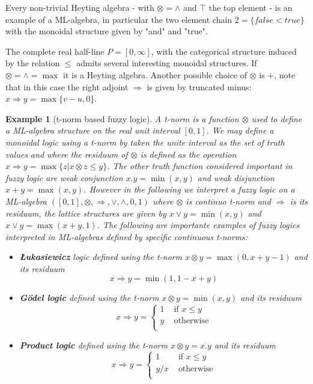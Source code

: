 \documentclass[oribibl]{llncs}
\newtheorem{exam}{Example}
\begin{document}
Every non-trivial Heyting algebra - with $\otimes=\wedge$ and $\top$ the top element - is an example of a ML-algebra, in particular the two element chain $2=\{false<true\}$ with the monoidal structure given by "and" and "true".

The complete real half-line $P=[0,\infty]$, with the categorical structure induced by the relation $\leq$ admits several interesting monoidal structures. If $\otimes=\wedge=\max$ it is a Heyting algebra. Another possible choice of $\otimes$ is +, note that in this case the right adjoint $\Rightarrow$ is given by truncated minus: $x\Rightarrow y=\max\{v-u,0\}$.

\begin{exam}[t-norm based fuzzy logic]
A t-norm is a function $\otimes$ used to define a ML-algebra structure on the real unit interval $[0,1]$. We may define a monoidal logic using a t-norm by taken the unite interval as the set of truth values and where the residuum of $\otimes$ is defined as the operation $x\Rightarrow y=\max\{z|x\otimes z\leq y\}$. The other truth function considered important in fuzzy logic are \emph{weak conjunction} $x.y=\min(x,y)$ and \emph{weak disjunction} $x+y=\max(x,y)$. However in the following we interpret a fuzzy logic on a ML-algebra $([0,1],\otimes,\Rightarrow,\vee,\wedge,0,1)$ where $\otimes$ is continuo t-norm and $\Rightarrow$ is its residuum, the lattice structures are given by $x\vee y=\min(x,y)$ and $x\vee y=\max(x+y,1)$.
The following are importante examples of fuzzy logics interpreted in ML-algebras defined by specific continuous t-norms:
\begin{itemize}
  \item \textbf{{\L}ukasiewicz} logic defined using the t-norm $x\otimes y=\max(0,x+y-1)$ and its residuum \[x\Rightarrow y=\min(1,1-x+y)\]
  \item \textbf{G\"{o}del logic} defined using the t-norm $x\otimes y=\min(x,y)$ and its residuum \[x\Rightarrow y= \left\{
                                      \begin{array}{cl}
                                        1 & \text{ if } x\leq y \\
                                        y & \text{ otherwise}\\
                                      \end{array}
                                    \right.
      \]
  \item \textbf{Product logic} defined using the t-norm $x\otimes y=x.y$ and its residuum \[x\Rightarrow y= \left\{
                                      \begin{array}{cl}
                                        1 & \text{ if } x\leq y \\
                                        y/x & \text{ otherwise}\\
                                      \end{array}
                                    \right.\]
\end{itemize}
\end{exam}
\end{document}
